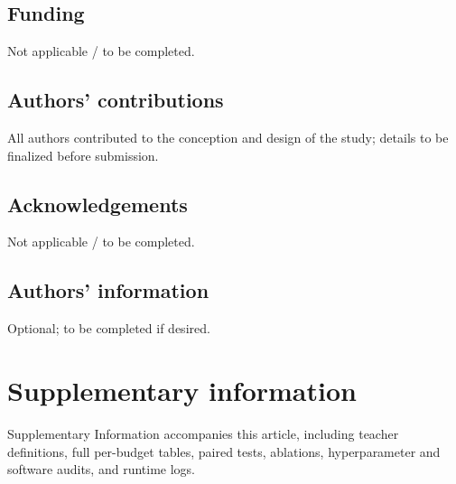 \documentclass[11pt,a4paper]{article}
\begin{document}
\subsection*{Funding}
Not applicable / to be completed.

\subsection*{Authors' contributions}
All authors contributed to the conception and design of the study; details to be finalized before submission.

\subsection*{Acknowledgements}
Not applicable / to be completed.

\subsection*{Authors' information}
Optional; to be completed if desired.

\section*{Supplementary information}
Supplementary Information accompanies this article, including teacher definitions, full per-budget tables, paired tests, ablations, hyperparameter and software audits, and runtime logs.



\end{document}
